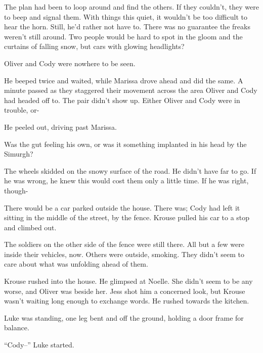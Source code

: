 The plan had been to loop around and find the others.  If they couldn't, they were to beep and signal them.  With things this quiet, it wouldn't be too difficult to hear the horn.  Still, he'd rather not have to.  There was no guarantee the freaks weren't still around.  Two people would be hard to spot in the gloom and the curtains of falling snow, but cars with glowing headlights?



Oliver and Cody were nowhere to be seen.



He beeped twice and waited, while Marissa drove ahead and did the same.  A minute passed as they staggered their movement across the area Oliver and Cody had headed off to.  The pair didn't show up.  Either Oliver and Cody were in trouble, or-



He peeled out, driving past Marissa.



Was the gut feeling his own, or was it something implanted in his head by the Simurgh?



The wheels skidded on the snowy surface of the road.  He didn't have far to go.  If he was wrong, he knew this would cost them only a little time.  If he was right, though-



There would be a car parked outside the house.  There was; Cody had left it sitting in the middle of the street, by the fence.  Krouse pulled his car to a stop and climbed out.



The soldiers on the other side of the fence were still there.  All but a few were inside their vehicles, now.  Others were outside, smoking.  They didn't seem to care about what was unfolding ahead of them.



Krouse rushed into the house.  He glimpsed at Noelle.  She didn't seem to be any worse, and Oliver was beside her.  Jess shot him a concerned look, but Krouse wasn't waiting long enough to exchange words.  He rushed towards the kitchen.



Luke was standing, one leg bent and off the ground, holding a door frame for balance.



``Cody--'' Luke started.



